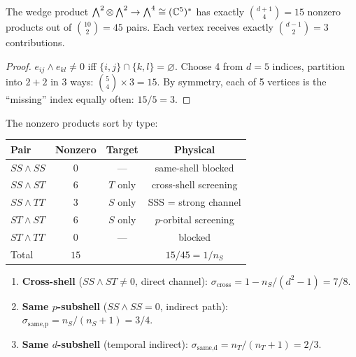 \begin{theorem}
\label{thm:wedge_count}
The wedge product $\bigwedge^2 \otimes \bigwedge^2 \to \bigwedge^4 \cong (\mathbb{C}^5)^*$ has exactly $\binom{d+1}{4} = 15$ nonzero products out of $\binom{10}{2} = 45$ pairs.  Each vertex receives exactly $\binom{d-1}{2} = 3$ contributions.
\end{theorem}

\begin{proof}
$e_{ij} \wedge e_{kl} \neq 0$ iff $\{i,j\} \cap \{k,l\} = \varnothing$.  Choose 4 from $d=5$ indices, partition into $2{+}2$ in $3$ ways: $\binom{5}{4} \times 3 = 15$.  By symmetry, each of 5 vertices is the ``missing'' index equally often: $15/5 = 3$.
\end{proof}

The nonzero products sort by type:
\begin{center}
\begin{tabular}{lccc}
\hline
Pair & Nonzero & Target & Physical \\
\hline
$SS \wedge SS$ & $0$ & --- & same-shell blocked \\
$SS \wedge ST$ & $6$ & $T$ only & cross-shell screening \\
$SS \wedge TT$ & $3$ & $S$ only & SSS = strong channel \\
$ST \wedge ST$ & $6$ & $S$ only & $p$-orbital screening \\
$ST \wedge TT$ & $0$ & --- & blocked \\
\hline
Total & $15$ & & $15/45 = 1/n_S$ \\
\hline
\end{tabular}
\end{center}

\begin{theorem}
\label{thm:sigma_wedge}
\leavevmode
\begin{enumerate}
\item \textbf{Cross-shell} ($SS \wedge ST \neq 0$, direct channel):
$\sigma_\text{cross} = 1 - n_S/(d^2\!-\!1) = 7/8$.

\item \textbf{Same $p$-subshell} ($SS \wedge SS = 0$, indirect path):
$\sigma_\text{same,p} = n_S/(n_S\!+\!1) = 3/4$.

\item \textbf{Same $d$-subshell} (temporal indirect):
$\sigma_\text{same,d} = n_T/(n_T\!+\!1) = 2/3$.
\end{enumerate}
\end{theorem}

